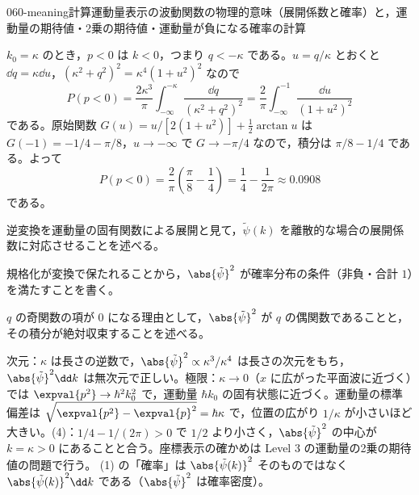 \documentclass[uplatex,dvipdfmx,a4paper,11pt]{jsarticle}
\begin{document}
\begin{mondai}{060-meaning}{計算}{運動量表示の波動関数の物理的意味（展開係数と確率）と，運動量の期待値・2乗の期待値・運動量が負になる確率の計算}
\begin{tadashii}
 $k_{0}=\kappa$ のとき，$p<0$ は $k<0$，つまり $q<-\kappa$ である。$u=q/\kappa$ とおくと $\dd q=\kappa\dd u$，$(\kappa^{2}+q^{2})^{2}=\kappa^{4}(1+u^{2})^{2}$ なので
\[ P(p<0)=\frac{2\kappa^{3}}{\pi}\int_{-\infty}^{-\kappa}\frac{\dd q}{(\kappa^{2}+q^{2})^{2}}=\frac{2}{\pi}\int_{-\infty}^{-1}\frac{\dd u}{(1+u^{2})^{2}} \]
である。原始関数 $G(u)=u/[2(1+u^{2})]+\frac{1}{2}\arctan u$ は $G(-1)=-1/4-\pi/8$，$u\to-\infty$ で $G\to-\pi/4$ なので，積分は $\pi/8-1/4$ である。よって
\[ P(p<0)=\frac{2}{\pi}\left(\frac{\pi}{8}-\frac{1}{4}\right)=\frac{1}{4}-\frac{1}{2\pi}\approx0.0908 \]
である。
\begin{ronten}
  \item {} 逆変換を運動量の固有関数による展開と見て，$\tilde{\psi}(k)$ を離散的な場合の展開係数に対応させることを述べる。
  \item {} 規格化が変換で保たれることから，$\abs{\tilde{\psi}}^{2}$ が確率分布の条件（非負・合計 $1$）を満たすことを書く。
  \item {} $q$ の奇関数の項が $0$ になる理由として，$\abs{\tilde{\psi}}^{2}$ が $q$ の偶関数であることと，その積分が絶対収束することを述べる。
\end{ronten}
\kenzan 次元：$\kappa$ は長さの逆数で，$\abs{\tilde{\psi}}^{2}\propto\kappa^{3}/\kappa^{4}$ は長さの次元をもち，$\abs{\tilde{\psi}}^{2}\dd k$ は無次元で正しい。極限：$\kappa\to0$（$x$ に広がった平面波に近づく）では $\expval{p^{2}}\to\hbar^{2}k_{0}^{2}$ で，運動量 $\hbar k_{0}$ の固有状態に近づく。運動量の標準偏差は $\sqrt{\expval{p^{2}}-\expval{p}^{2}}=\hbar\kappa$ で，位置の広がり $1/\kappa$ が小さいほど大きい。(4)：$1/4-1/(2\pi)>0$ で $1/2$ より小さく，$\abs{\tilde{\psi}}^{2}$ の中心が $k=\kappa>0$ にあることと合う。座標表示の確かめは Level 3 の運動量の2乗の期待値の問題で行う。
\tsumazuki (1) の「確率」は $\abs{\tilde{\psi}(k)}^{2}$ そのものではなく $\abs{\tilde{\psi}(k)}^{2}\dd k$ である（$\abs{\tilde{\psi}}^{2}$ は確率密度）。
\end{tadashii}
\end{mondai}
\end{document}
